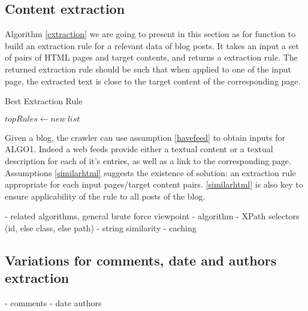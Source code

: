 \subsection{Content extraction}

Algorithm \ref{extraction} we are going to present in this section as for function to build an extraction rule for a relevant data of blog posts. It takes an input a set of pairs of HTML pages and target contents, and returns a extraction rule. The returned extraction rule should be such that when applied to one of the input page, the extracted text is close to the target content of the corresponding page.


\begin{algorithm}
  \caption{Best Extraction Rule}\label{extraction}
  \thinspace
  \DontPrintSemicolon

  \BlankLine
  $topRules \longleftarrow new~list$\;
  \;
\end{algorithm}


Given a blog, the crawler can use assumption \ref{havefeed} to obtain inputs for ALGO1. Indeed a web feeds provide either a textual content or a textual description for each of it's entries, as well as a link to the corresponding page. Assumptions \ref{similarhtml} suggests the existence of solution: an extraction rule appropriate for each input pages/target content pairs. \ref{similarhtml} is also key to ensure applicability of the rule to all posts of the blog.

- related algorithms, general brute force viewpoint
- algorithm
- XPath selectors (id, else class, else path)
- string similarity
- caching


\subsection{Variations for comments, date and authors extraction}
- comments
- date authors
